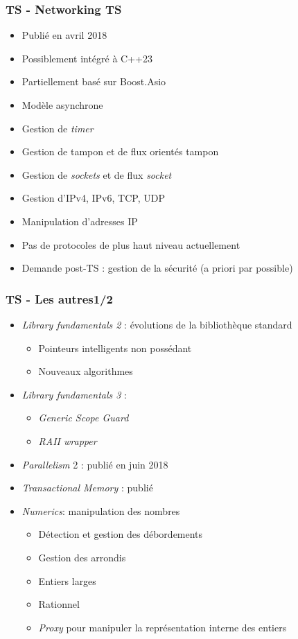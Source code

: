\documentclass[C++.tex]{subfiles}
\begin{document}
\begin{frame}
	\frametitle{TS - Networking TS}
	\begin{itemize}
		\item Publié en avril 2018
		\item Possiblement intégré à C++23
		\item Partiellement basé sur Boost.Asio
		\item Modèle asynchrone
		\item Gestion de \textit{timer}
		\item Gestion de tampon et de flux orientés tampon
		\item Gestion de \textit{sockets} et de flux \og \textit{socket}\fg{}
		\item Gestion d'IPv4, IPv6, TCP, UDP
		\item Manipulation d'adresses IP
		\item Pas de protocoles de plus haut niveau actuellement
		\item Demande post-TS : gestion de la sécurité (a priori par possible)
	\end{itemize}
\end{frame}

\begin{frame}
	\frametitle{TS - Les autres\titlehfill{}1/2}
	\begin{itemize}
		\item \textit{Library fundamentals 2} : évolutions de la bibliothèque standard
		\begin{itemize}
			\item Pointeurs intelligents non possédant
			\item Nouveaux algorithmes
		\end{itemize}
		\item \textit{Library fundamentals 3} :
		\begin{itemize}
			\item \textit{Generic Scope Guard}
			\item \textit{RAII wrapper}
		\end{itemize}
		\item \textit{Parallelism} 2 : publié en juin 2018
		\item \textit{Transactional Memory} : publié
		\item \textit{Numerics}: manipulation des nombres
		\begin{itemize}
			\item Détection et gestion des débordements
			\item Gestion des arrondis
			\item Entiers larges
			\item Rationnel
			\item \textit{Proxy} pour manipuler la représentation interne des entiers
		\end{itemize}
	\end{itemize}
\end{frame}
\end{document}
